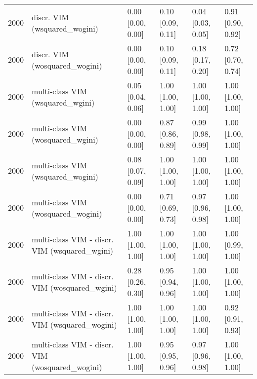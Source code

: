 \begin{table}[ht]
\begin{tabular}{rlllll}
  2000 & discr. VIM (wsquared\_wogini) & 0.00 [0.00, 0.00] & 0.10 [0.09, 0.11] & 0.04 [0.03, 0.05] & 0.91 [0.90, 0.92] \\ 
  2000 & discr. VIM (wosquared\_wogini) & 0.00 [0.00, 0.00] & 0.10 [0.09, 0.11] & 0.18 [0.17, 0.20] & 0.72 [0.70, 0.74] \\ 
  2000 & multi-class VIM (wsquared\_wgini) & 0.05 [0.04, 0.06] & 1.00 [1.00, 1.00] & 1.00 [1.00, 1.00] & 1.00 [1.00, 1.00] \\ 
  2000 & multi-class VIM (wosquared\_wgini) & 0.00 [0.00, 0.00] & 0.87 [0.86, 0.89] & 0.99 [0.98, 0.99] & 1.00 [1.00, 1.00] \\ 
  2000 & multi-class VIM (wsquared\_wogini) & 0.08 [0.07, 0.09] & 1.00 [1.00, 1.00] & 1.00 [1.00, 1.00] & 1.00 [1.00, 1.00] \\ 
  2000 & multi-class VIM (wosquared\_wogini) & 0.00 [0.00, 0.00] & 0.71 [0.69, 0.73] & 0.97 [0.96, 0.98] & 1.00 [1.00, 1.00] \\ 
  2000 & multi-class VIM - discr. VIM (wsquared\_wgini) & 1.00 [1.00, 1.00] & 1.00 [1.00, 1.00] & 1.00 [1.00, 1.00] & 1.00 [0.99, 1.00] \\ 
  2000 & multi-class VIM - discr. VIM (wosquared\_wgini) & 0.28 [0.26, 0.30] & 0.95 [0.94, 0.96] & 1.00 [1.00, 1.00] & 1.00 [1.00, 1.00] \\ 
  2000 & multi-class VIM - discr. VIM (wsquared\_wogini) & 1.00 [1.00, 1.00] & 1.00 [1.00, 1.00] & 1.00 [1.00, 1.00] & 0.92 [0.91, 0.93] \\ 
  2000 & multi-class VIM - discr. VIM (wosquared\_wogini) & 1.00 [1.00, 1.00] & 0.95 [0.95, 0.96] & 0.97 [0.96, 0.98] & 1.00 [1.00, 1.00] \\ 
   \hline
\end{tabular}
\end{table}
